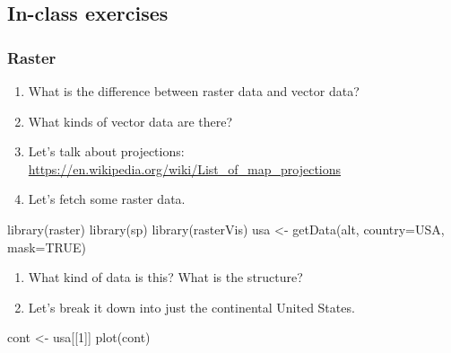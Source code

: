 \documentclass[
]{book}
\newenvironment{Shaded}{\begin{snugshade}}{\end{snugshade}}
\newcommand{\AttributeTok}[1]{\textcolor[rgb]{0.77,0.63,0.00}{#1}}
\newcommand{\ConstantTok}[1]{\textcolor[rgb]{0.00,0.00,0.00}{#1}}
\newcommand{\DecValTok}[1]{\textcolor[rgb]{0.00,0.00,0.81}{#1}}
\newcommand{\FunctionTok}[1]{\textcolor[rgb]{0.00,0.00,0.00}{#1}}
\newcommand{\NormalTok}[1]{#1}
\newcommand{\OtherTok}[1]{\textcolor[rgb]{0.56,0.35,0.01}{#1}}
\newcommand{\StringTok}[1]{\textcolor[rgb]{0.31,0.60,0.02}{#1}}
\begin{document}
\hypertarget{in-class-exercises}{%
\subsection*{In-class exercises}\label{in-class-exercises}}

\hypertarget{raster}{%
\subsubsection*{Raster}\label{raster}}

\begin{enumerate}
\def\labelenumi{\arabic{enumi}.}
\item
  What is the difference between raster data and vector data?
\item
  What kinds of vector data are there?
\item
  Let's talk about projections: \url{https://en.wikipedia.org/wiki/List_of_map_projections}
\item
  Let's fetch some raster data.
\end{enumerate}

\begin{Shaded}
\begin{Highlighting}[]
\FunctionTok{library}\NormalTok{(raster)}
\FunctionTok{library}\NormalTok{(sp)}
\FunctionTok{library}\NormalTok{(rasterVis)}
\NormalTok{usa }\OtherTok{\textless{}{-}} \FunctionTok{getData}\NormalTok{(}\StringTok{\textquotesingle{}alt\textquotesingle{}}\NormalTok{, }\AttributeTok{country=}\StringTok{\textquotesingle{}USA\textquotesingle{}}\NormalTok{, }\AttributeTok{mask=}\ConstantTok{TRUE}\NormalTok{)}
\end{Highlighting}
\end{Shaded}

\begin{enumerate}
\def\labelenumi{\arabic{enumi}.}
\setcounter{enumi}{4}
\item
  What kind of data is this? What is the structure?
\item
  Let's break it down into just the continental United States.
\end{enumerate}

\begin{Shaded}
\begin{Highlighting}[]
\NormalTok{cont }\OtherTok{\textless{}{-}}\NormalTok{ usa[[}\DecValTok{1}\NormalTok{]]}
\FunctionTok{plot}\NormalTok{(cont)}
\end{Highlighting}
\end{Shaded}
\end{document}

